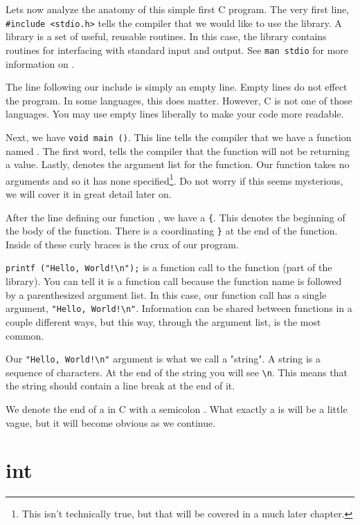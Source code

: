 Lets now analyze the anatomy of this simple first C program. The very first
line, \verb|#include <stdio.h>| tells the compiler that we would like to use
the  library. A library is a set of useful, reusable routines. In
this case, the  library contains routines for interfacing with
standard input and output. See \verb|man stdio| for more information on
.

The line following our include is simply an empty line. Empty lines do not
effect the program. In some languages, this does matter. However, C is not one
of those languages. You may use empty lines liberally to make your code more
readable.

Next, we have \verb|void main ()|. This line tells the compiler that we have a
function named . The first word,  tells the compiler
that the function will not be returning a value. Lastly, \ident{()} denotes the
argument list for the function. Our  function takes no arguments
and so it has none specified\footnote[1]{This isn't technically true, but that
will be covered in a much later chapter.}. Do not worry if this seems
mysterious, we will cover it in great detail later on.

After the line defining our function , we have a \verb|{|. This
denotes the beginning of the body of the function. There is a coordinating
\verb|}| at the end of the function. Inside of these curly braces is the crux
of our program.

\verb|printf ("Hello, World!\n");| is a function call to the 
function (part of the  library). You can tell it is a function
call because the function name is followed by a parenthesized argument list.
In this case, our function call has a single argument,
\verb|"Hello, World!\n"|. Information can be shared between functions in
a couple different ways, but this way, through the argument list, is the
most common.

Our \verb|"Hello, World!\n"| argument is what we call a "string". A string
is a sequence of characters. At the end of the string you will see \verb|\n|.
This means that the string should contain a line break at the end of it.

We denote the end of a  in C with a semicolon \ident{;}.
What exactly a  is will be a little vague, but it will
become obvious as we continue.

\section{int}

